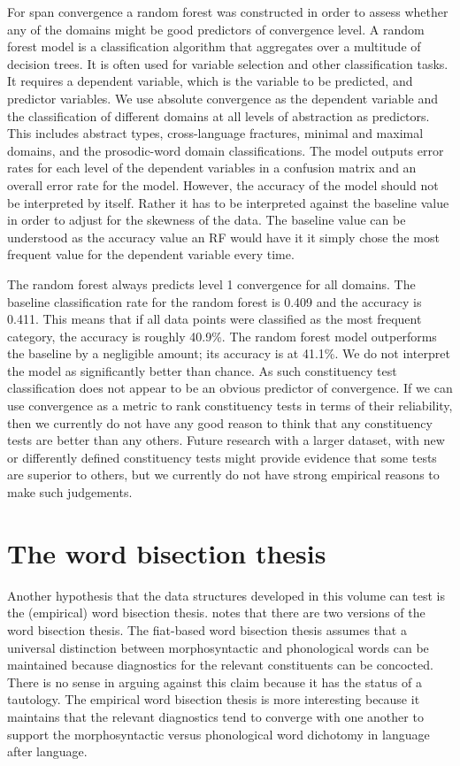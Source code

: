 \documentclass[output=paper,draftmode]{langscibook}
\begin{document}
For span convergence a random forest was constructed in order to assess whether any of the domains might be good predictors of convergence level. 
A random forest model is a classification algorithm that aggregates over a multitude of decision trees. It is often used for variable selection and other classification tasks. It requires a dependent variable, which is the variable to be predicted, and predictor variables.
We use absolute convergence as the dependent variable and the classification of different domains at all levels of abstraction as predictors. This includes abstract types, cross-language fractures, minimal and maximal domains, and the prosodic-word domain classifications.
The model outputs error rates for each level of the dependent variables in a confusion matrix and an overall error rate for the model. However, the accuracy of the model should not be interpreted by itself. Rather it has to be interpreted against the baseline value in order to adjust for the skewness of the data. The baseline value can be understood as the accuracy value an RF would have it it simply chose the most frequent value for the dependent variable every time.

The random forest always predicts level 1 convergence for all domains. The baseline classification rate for the random forest is 0.409 and the accuracy is 0.411. This means that if all data points were classified as the most frequent category, the accuracy is roughly 40.9\%. The random forest model outperforms the baseline by a negligible amount; its accuracy is at 41.1\%. We do not interpret the model as significantly better than chance. As such constituency test classification does not appear to be an obvious predictor of convergence. If we can use convergence as a metric to rank constituency tests in terms of their reliability, then we currently do not have any good reason to think that any constituency tests are better than any others. Future research with a larger dataset, with new or differently defined constituency tests might provide evidence that some tests are superior to others, but we currently do not have strong empirical reasons to make such judgements.

\section{The word bisection thesis}
\label{sec:wordbisectionthesis}

Another hypothesis that the data structures developed in this volume can test is the (empirical) word bisection thesis.  notes that there are two versions of the word bisection thesis. The fiat-based word bisection thesis assumes that a universal distinction between morphosyntactic and phonological words can be maintained because diagnostics for the relevant constituents can be concocted. There is no sense in arguing against this claim because it has the status of a tautology. The empirical word bisection thesis is more interesting because it maintains that the relevant diagnostics tend to converge with one another to support the morphosyntactic versus phonological word dichotomy in language after language.
\end{document}

